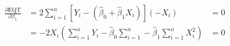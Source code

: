 \documentclass[
  12pt,
  letterpaper,
  DIV=11,
  numbers=noendperiod]{scrartcl}
\begin{document}
\begin{equation}
\begin{aligned}
\frac{\partial \text{EQT}}{\partial \beta_1} & = 2\sum_{i=1}^{n}[Y_i - (\hat{\beta}_0 + \hat{\beta}_1X_i)] (-X_i) & = 0 \\
& = -2X_i (\sum_{i=1}^{n} Y_i - \hat{\beta}_0\sum_{i=1}^{n} - \hat{\beta}_1\sum_{i=1}^{n} X_i^2) & = 0 \\
\end{aligned}
\end{equation}
\end{document}
